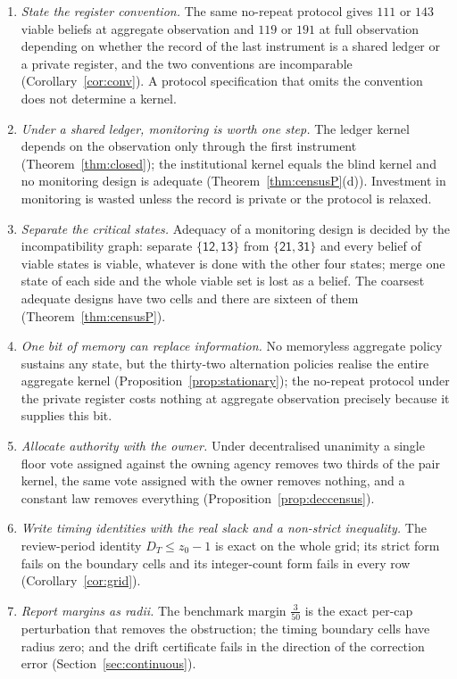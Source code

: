 \documentclass[11pt,a4paper]{article}
\theoremstyle{plain}
\theoremstyle{definition}
\theoremstyle{remark}
\newcommand{\st}[1]{\mathsf{#1}}
\begin{document}
\begin{enumerate}[leftmargin=2em,itemsep=2pt]
\item \emph{State the register convention.} The same no-repeat protocol gives $111$ or $143$ viable beliefs at aggregate observation and $119$ or $191$ at full observation depending on whether the record of the last instrument is a shared ledger or a private register, and the two conventions are incomparable (Corollary~\ref{cor:conv}). A protocol specification that omits the convention does not determine a kernel.
\item \emph{Under a shared ledger, monitoring is worth one step.} The ledger kernel depends on the observation only through the first instrument (Theorem~\ref{thm:closed}); the institutional kernel equals the blind kernel and no monitoring design is adequate (Theorem~\ref{thm:censusP}(d)). Investment in monitoring is wasted unless the record is private or the protocol is relaxed.
\item \emph{Separate the critical states.} Adequacy of a monitoring design is decided by the incompatibility graph: separate $\{\st{12},\st{13}\}$ from $\{\st{21},\st{31}\}$ and every belief of viable states is viable, whatever is done with the other four states; merge one state of each side and the whole viable set is lost as a belief. The coarsest adequate designs have two cells and there are sixteen of them (Theorem~\ref{thm:censusP}).
\item \emph{One bit of memory can replace information.} No memoryless aggregate policy sustains any state, but the thirty-two alternation policies realise the entire aggregate kernel (Proposition~\ref{prop:stationary}); the no-repeat protocol under the private register costs nothing at aggregate observation precisely because it supplies this bit.
\item \emph{Allocate authority with the owner.} Under decentralised unanimity a single floor vote assigned against the owning agency removes two thirds of the pair kernel, the same vote assigned with the owner removes nothing, and a constant law removes everything (Proposition~\ref{prop:deccensus}).
\item \emph{Write timing identities with the real slack and a non-strict inequality.} The review-period identity $D_T\le z_0-1$ is exact on the whole grid; its strict form fails on the boundary cells and its integer-count form fails in every row (Corollary~\ref{cor:grid}).
\item \emph{Report margins as radii.} The benchmark margin $\tfrac3{50}$ is the exact per-cap perturbation that removes the obstruction; the timing boundary cells have radius zero; and the drift certificate fails in the direction of the correction error (Section~\ref{sec:continuous}).
\end{enumerate}
\end{document}
